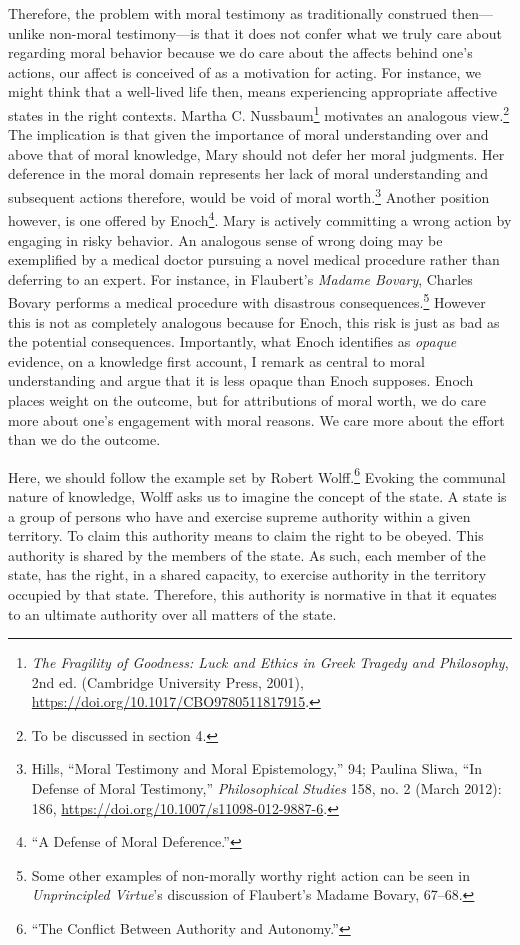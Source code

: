 \documentclass[phdthesis,12pt,final,a4paper]{wuthesis}
\theoremstyle{definition}
\theoremstyle{definition}
\theoremstyle{definition}
\theoremstyle{definition}
\theoremstyle{remark}
\begin{document}
Therefore, the problem with moral testimony as traditionally construed then---unlike non-moral testimony---is that it does not confer what we truly care about regarding moral behavior because we do care about the affects behind one's actions, our affect is conceived of as a motivation for acting. For instance, we might think that a well-lived life then, means experiencing appropriate affective states in the right contexts. Martha C. Nussbaum\footnote{\emph{The {Fragility} of {Goodness}: {Luck} and {Ethics} in {Greek Tragedy} and {Philosophy}}, 2nd ed. (Cambridge University Press, 2001), \url{https://doi.org/10.1017/CBO9780511817915}.} motivates an analogous view.\footnote{To be discussed in section 4.} The implication is that given the importance of moral understanding over and above that of moral knowledge, Mary should not defer her moral judgments. Her deference in the moral domain represents her lack of moral understanding and subsequent actions therefore, would be void of moral worth.\footnote{Hills, {``Moral Testimony and Moral Epistemology,''} 94; Paulina Sliwa, {``In Defense of Moral Testimony,''} \emph{Philosophical Studies} 158, no. 2 (March 2012): 186, \url{https://doi.org/10.1007/s11098-012-9887-6}.} Another position however, is one offered by Enoch\footnote{{``A {Defense} of {Moral Deference}.''}}. Mary is actively committing a wrong action by engaging in risky behavior. An analogous sense of wrong doing may be exemplified by a medical doctor pursuing a novel medical procedure rather than deferring to an expert. For instance, in Flaubert's \emph{Madame Bovary}, Charles Bovary performs a medical procedure with disastrous consequences.\footnote{ Some other examples of non-morally worthy right action can be seen in \emph{Unprincipled {Virtue}}'s discussion of Flaubert's Madame Bovary, 67--68.} However this is not as completely analogous because for Enoch, this risk is just as bad as the potential consequences. Importantly, what Enoch identifies as \emph{opaque} evidence, on a knowledge first account, I remark as central to moral understanding and argue that it is less opaque than Enoch supposes. Enoch places weight on the outcome, but for attributions of moral worth, we do care more about one's engagement with moral reasons. We care more about the effort than we do the outcome.

Here, we should follow the example set by Robert Wolff.\footnote{{``The {Conflict Between Authority} and {Autonomy}.''}} Evoking the communal nature of knowledge, Wolff asks us to imagine the concept of the state. A state is a group of persons who have and exercise supreme authority within a given territory. To claim this authority means to claim the right to be obeyed. This authority is shared by the members of the state. As such, each member of the state, has the right, in a shared capacity, to exercise authority in the territory occupied by that state. Therefore, this authority is normative in that it equates to an ultimate authority over all matters of the state.
\end{document}

